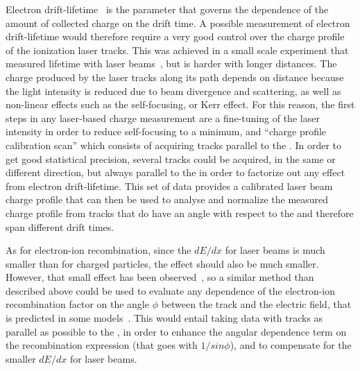 Electron drift-lifetime~\cite{bib:uBlifetime, Antonello:2014eha} is the parameter that governs the dependence of the amount of collected charge on the drift time. A possible measurement of electron drift-lifetime would therefore require a very good control over the charge profile of the ionization laser tracks. This was achieved in a small scale experiment that measured lifetime with laser beams~\cite{Ereditato:2013xaa}, but is harder with longer distances. The charge produced by the laser tracks along its path depends on distance because the light intensity is reduced due to beam divergence and scattering, as well as non-linear effects such as the self-focusing, or Kerr effect. For this reason, the first steps in any laser-based charge measurement are a fine-tuning of the laser intensity in order to reduce self-focusing to a minimum, and ``charge profile calibration scan'' which consists of acquiring tracks parallel to the . In order to get good statistical precision, several tracks could be acquired, in the same or different direction, but always parallel to the  in order to factorize out any effect from electron drift-lifetime. This set of data provides a calibrated laser beam charge profile that can then be used to analyse and normalize the measured charge profile from tracks that do have an angle with respect to the  and therefore span different drift times.

As for electron-ion recombination, since the $dE/dx$ for laser beams is much smaller than for charged particles, the effect should also be much smaller. However, that small effect has been observed~\cite{Badhrees:2010zz}, so a similar method than described above could be used to evaluate any dependence of the electron-ion recombination factor on the angle $\phi$ between the track and the electric field, that is predicted in some models~\cite{Acciarri:2013met}. This would entail taking data with tracks as parallel as possible to the \efield, in order to enhance the angular dependence term on the recombination expression (that goes with $1/sin \phi$), and to compensate for the smaller $dE/dx$ for laser beams.






